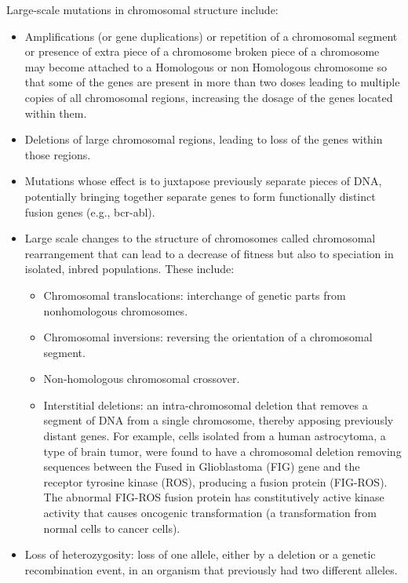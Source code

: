 Large-scale mutations in chromosomal structure include:

\begin{itemize}
\tightlist
\item
  Amplifications (or gene duplications) or repetition of a chromosomal segment or presence of extra piece of a chromosome broken piece of a chromosome may become attached to a Homologous or non Homologous chromosome so that some of the genes are present in more than two doses leading to multiple copies of all chromosomal regions, increasing the dosage of the genes located within them.
\item
  Deletions of large chromosomal regions, leading to loss of the genes within those regions.
\item
  Mutations whose effect is to juxtapose previously separate pieces of DNA, potentially bringing together separate genes to form functionally distinct fusion genes (e.g., bcr-abl).
\item
  Large scale changes to the structure of chromosomes called chromosomal rearrangement that can lead to a decrease of fitness but also to speciation in isolated, inbred populations. These include:

  \begin{itemize}
  \tightlist
  \item
    Chromosomal translocations: interchange of genetic parts from nonhomologous chromosomes.
  \item
    Chromosomal inversions: reversing the orientation of a chromosomal segment.
  \item
    Non-homologous chromosomal crossover.
  \item
    Interstitial deletions: an intra-chromosomal deletion that removes a segment of DNA from a single chromosome, thereby apposing previously distant genes. For example, cells isolated from a human astrocytoma, a type of brain tumor, were found to have a chromosomal deletion removing sequences between the Fused in Glioblastoma (FIG) gene and the receptor tyrosine kinase (ROS), producing a fusion protein (FIG-ROS). The abnormal FIG-ROS fusion protein has constitutively active kinase activity that causes oncogenic transformation (a transformation from normal cells to cancer cells).
  \end{itemize}
\item
  Loss of heterozygosity: loss of one allele, either by a deletion or a genetic recombination event, in an organism that previously had two different alleles.
\end{itemize}

